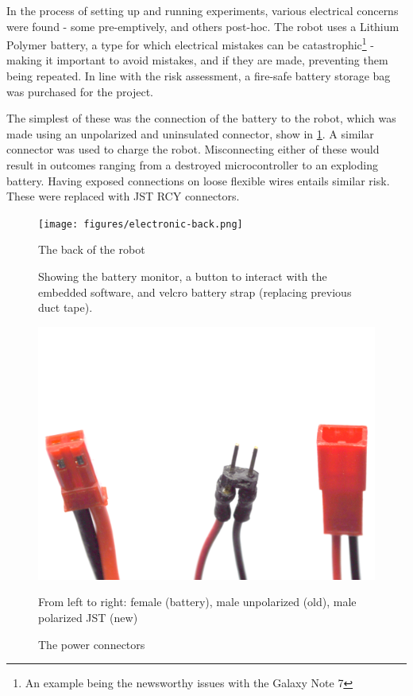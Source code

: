 \documentclass[main.tex]{subfiles}
\begin{document}
In the process of setting up and running experiments, various electrical concerns were found - some pre-emptively, and others post-hoc. The robot uses a Lithium Polymer battery, a type for which electrical mistakes can be catastrophic\footnote{An example being the newsworthy \cite{bbc-samsung-explosion} issues with the Galaxy Note 7} - making it important to avoid mistakes, and if they are made, preventing them being repeated. In line with the risk assessment, a fire-safe battery storage bag was purchased for the project.

The simplest of these was the connection of the battery to the robot, which was made using an unpolarized and uninsulated connector, show in \cref{fig:connectors}. A similar connector was used to charge the robot. Misconnecting either of these would result in outcomes ranging from a destroyed microcontroller to an exploding battery. Having exposed connections on loose flexible wires entails similar risk. These were replaced with JST RCY connectors.

\begin{figure}
	\begin{minipage}[t]{0.6\linewidth - 1em}
		\centering
		\texttt{[image: figures/electronic-back.png]}
		\caption{The back of the robot}
		\label{fig:robot-back}
		\medskip
		\small
		Showing the battery monitor, a button to interact with the embedded software, and velcro battery strap
		(replacing previous duct tape).
	\end{minipage}\hfill
	\begin{minipage}[t]{0.4\linewidth - 1em}
		\centering
		\includegraphics[width=\linewidth]{figures/battery-connectors.png}
		\caption{The power connectors}
		\label{fig:connectors}
		\medskip
		\small
		From left to right: female (battery), male unpolarized (old), male polarized JST (new)
	\end{minipage}
\end{figure}
\end{document}

